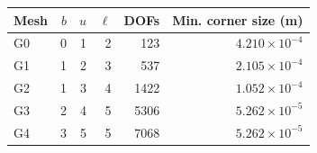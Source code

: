 \begin{tabular}{@{}lrrrrr@{}}
\toprule
Mesh & $b$ & $u$ & $\ell$ & DOFs & Min. corner size (m)\\
\midrule
G0 & 0 & 1 & 2 & 123 & $4.210\times10^{-4}$\\
G1 & 1 & 2 & 3 & 537 & $2.105\times10^{-4}$\\
G2 & 1 & 3 & 4 & 1422 & $1.052\times10^{-4}$\\
G3 & 2 & 4 & 5 & 5306 & $5.262\times10^{-5}$\\
G4 & 3 & 5 & 5 & 7068 & $5.262\times10^{-5}$\\
\bottomrule
\end{tabular}
